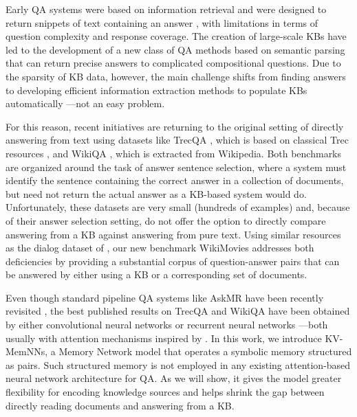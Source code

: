 \documentclass[11pt,letterpaper]{article}
\begin{document}
Early QA systems were based on information retrieval and were designed
to return snippets of text containing an answer
\citep{voorhees2000building,banko2002askmsr}, with limitations in terms of question
complexity and response coverage.
The creation of large-scale KBs
\citep{auer2007dbpedia,bollacker2008freebase} have led to the
development of a new class of QA methods based on semantic parsing
\citep{berant2013semantic,kwiatkowski-EtAl:2013:EMNLP,fader2014open,yih2015semantic}
that can return precise answers to complicated compositional questions.
Due to the sparsity of KB data, however, the main challenge
shifts from finding answers to developing efficient information
extraction methods to populate KBs automatically
\citep{craven2000learning,carlson2010toward}---not an easy
problem.

For this reason, recent initiatives are returning to the original
setting of directly answering from text using
datasets like {\sc TrecQA} \citep{wang2007jeopardy},
which is based on classical {\sc Trec} resources \citep{voorhees1999trec},
and {\sc WikiQA} \citep{yang2015wikiqa}, which is extracted from Wikipedia.
Both benchmarks are organized around the task of answer sentence
selection, where a system must identify the sentence containing
the correct answer in a collection of documents, but need not return the
actual answer as a KB-based system would do.
Unfortunately, these datasets are very small (hundreds of
examples) and, because of their answer selection setting, do not
offer the option to directly compare answering from a KB against answering from pure text.
Using similar resources as the dialog dataset
of \cite{dodge2015evaluating}, our new benchmark {\sc WikiMovies}
addresses both deficiencies by providing a substantial
corpus of question-answer pairs that can be answered by either using a
KB or a corresponding set of documents.




Even though standard pipeline QA systems like AskMR
\citep{banko2002askmsr} have been recently revisited
\citep{tsai2015web},
the best published results on {\sc TrecQA} and {\sc WikiQA} have been
obtained by either convolutional neural networks
\citep{santos2016attentive,yin2015convolutional,wang2016sentence} or
recurrent neural networks \citep{miao2015neural}---both usually with
attention mechanisms inspired by \citep{bahdanau2014neural}.
In this work, we introduce KV-MemNNs, a Memory Network model that operates a symbolic memory structured as  pairs.
Such structured memory is not employed
 in any existing attention-based neural network architecture for QA.
As we will show, it gives the model greater
flexibility for encoding knowledge sources
and helps shrink the gap between
directly reading documents and answering from a KB.
\end{document}
